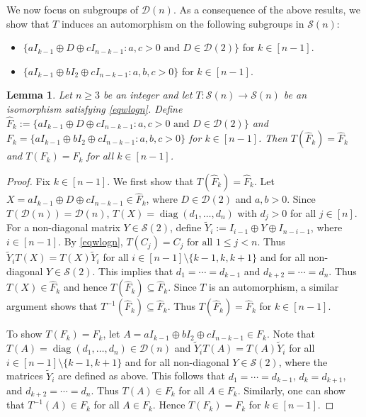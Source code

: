 \documentclass[11pt,reqno]{amsart}
\theoremstyle{plain}
\newtheorem{lemma}[theorem]{Lemma}
\theoremstyle{definition}
\numberwithin{equation}{section}
\DeclareMathOperator{\diag}{diag}
\def\cS{\mathcal S}
\def\cD{\mathcal D}
\begin{document}
We now focus on subgroups of $\cD(n)$. As a consequence of the above results, we show that $T$ induces an automorphism on the following subgroups in $\cS(n)$:
\begin{itemize}
	\item $\{aI_{k-1}\oplus D \oplus cI_{n-k-1}: a,c>0 \text{ and } D\in \cD(2)\}$ for $k \in [n-1]$.
	\item $\{aI_{k-1}\oplus bI_2 \oplus cI_{n-k-1}: a,b,c>0\}$ for $k \in [n-1]$.
\end{itemize}
\begin{lemma}\label{pclem3.12}
Let $n\geq 3$ be an integer and let $T:\cS(n) \to \cS(n)$ be an isomorphism satisfying \eqref{eqwlogn}. Define $\hat F_k:=\{aI_{k-1}\oplus D \oplus cI_{n-k-1}: a,c>0 \text{ and } D\in \cD(2)\}$ and $F_k=\{aI_{k-1}\oplus bI_2 \oplus cI_{n-k-1}: a,b,c>0\}$ for $k\in[n-1]$.  Then $T(\hat F_k)=\hat F_k$ and $T(F_k)=F_k$ for all $k\in[n-1]$.
\end{lemma}
\begin{proof}
 Fix $k\in [n-1]$. We first show that $T(\hat F_k)=\hat F_k$. Let $X=aI_{k-1}\oplus D \oplus cI_{n-k-1}\in \hat F_k$, where $D\in \cD(2)$ and $a,b>0$. Since $T(\cD(n))=\cD(n)$,  $T(X)=\diag(d_1,\ldots,d_n)$ with $d_j>0$ for all $j\in [n]$. For a non-diagonal matrix $Y \in \cS(2)$, define $\tilde Y_i:=I_{i-1}\oplus Y \oplus I_{n-i-1}$, where $i\in [n-1]$. By \eqref{eqwlogn},  $T(C_j)= C_j \text{ for all } 1 \le j < n$. Thus $\tilde Y_iT(X)=T(X)\tilde Y_i$ for all $i\in [n-1]\setminus\{k-1,k, k+1\}$ and for all non-diagonal $Y \in \cS(2)$.  This implies that $d_1=\cdots=d_{k-1}$ and  $d_{k+2}=\cdots=d_{n}$. Thus $T(X) \in \hat F_k$ and hence $T(\hat F_k)\subseteq \hat F_k$. Since $T$ is an automorphism, a similar argument shows that $T^{-1}(\hat F_k)\subseteq \hat F_k$. Thus $T(\hat F_k)= \hat F_k$ for $k\in [n-1]$.

To show $T(F_k)=F_k$, let $A=aI_{k-1}\oplus bI_2 \oplus cI_{n-k-1}\in F_k$. Note that $T(A)=\diag(d_1,\ldots,d_n) \in \cD(n)$ and  $\tilde Y_iT(A)=T(A)\tilde Y_i$ for all $i\in [n-1]\setminus\{k-1, k+1\}$ and for all non-diagonal $Y \in \cS(2)$, where the matrices $\tilde Y_i$ are defined as above.  This follows that  $d_1=\cdots=d_{k-1}$, $d_k=d_{k+1}$, and  $d_{k+2}=\cdots=d_{n}$. Thus $T(A) \in F_k$ for all $A\in  F_k$. Similarly, one can show that $T^{-1}(A) \in  F_k$ for all $A\in  F_k$. Hence  $T( F_k)= F_k$ for $k\in [n-1]$.
\end{proof}
\end{document}
